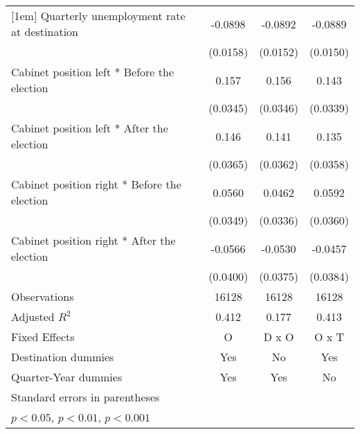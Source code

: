 \begin{table}[htbp]
\begin{tabular}{l*{3}{c}}
[1em]
Quarterly unemployment rate at destination&     -0.0898\sym{***}&     -0.0892\sym{***}&     -0.0889\sym{***}\\
                    &    (0.0158)         &    (0.0152)         &    (0.0150)         \\
[1em]
Cabinet position left * Before the election&       0.157\sym{***}&       0.156\sym{***}&       0.143\sym{***}\\
                    &    (0.0345)         &    (0.0346)         &    (0.0339)         \\
[1em]
Cabinet position left * After the election&       0.146\sym{***}&       0.141\sym{***}&       0.135\sym{***}\\
                    &    (0.0365)         &    (0.0362)         &    (0.0358)         \\
[1em]
Cabinet position right * Before the election&      0.0560         &      0.0462         &      0.0592         \\
                    &    (0.0349)         &    (0.0336)         &    (0.0360)         \\
[1em]
Cabinet position right * After the election&     -0.0566         &     -0.0530         &     -0.0457         \\
                    &    (0.0400)         &    (0.0375)         &    (0.0384)         \\
\hline
Observations        &       16128         &       16128         &       16128         \\
Adjusted \(R^{2}\)  &       0.412         &       0.177         &       0.413         \\
Fixed Effects       &           O         &       D x O         &       O x T         \\
Destination dummies &         Yes         &          No         &         Yes         \\
Quarter-Year dummies&         Yes         &         Yes         &          No         \\
\hline\hline
\multicolumn{4}{l}{\footnotesize Standard errors in parentheses}\\
\multicolumn{4}{l}{\footnotesize \sym{*} \(p<0.05\), \sym{**} \(p<0.01\), \sym{***} \(p<0.001\)}\\
\end{tabular}
\end{table}
